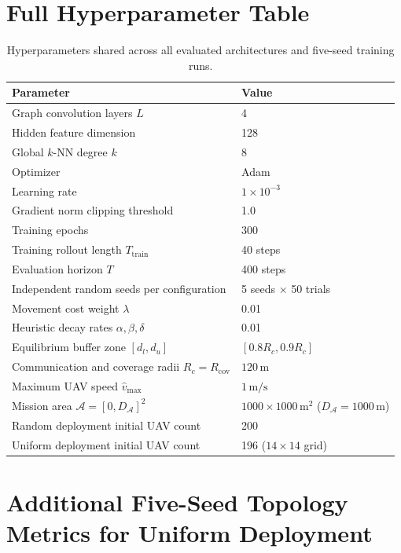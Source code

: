 \documentclass[11pt]{article}
\theoremstyle{plain}
\theoremstyle{definition}
\theoremstyle{remark}
\begin{document}
\section{Full Hyperparameter Table}
\label{app:hyperparams}

\begin{table}[ht]
\centering
\caption{Hyperparameters shared across all evaluated architectures and five-seed training runs.}
\small
\begin{tabular}{@{}ll@{}}
\toprule
Parameter & Value \\
\midrule
Graph convolution layers $L$ & 4 \\
Hidden feature dimension & 128 \\
Global $k$-NN degree $k$ & 8 \\
Optimizer & Adam \\
Learning rate & $1\times10^{-3}$ \\
Gradient norm clipping threshold & 1.0 \\
Training epochs & 300 \\
Training rollout length $T_{\mathrm{train}}$ & 40 steps \\
Evaluation horizon $T$ & 400 steps \\
Independent random seeds per configuration & 5 seeds $\times$ 50 trials \\
Movement cost weight $\lambda$ & 0.01 \\
Heuristic decay rates $\alpha, \beta, \delta$ & 0.01 \\
Equilibrium buffer zone $[d_l, d_u]$ & $[0.8 R_c, 0.9 R_c]$ \\
Communication and coverage radii $R_c = R_{\mathrm{cov}}$ & $120\,\mathrm{m}$ \\
Maximum UAV speed $\hat{v}_{\max}$ & $1\,\mathrm{m/s}$ \\
Mission area $\mathcal{A} = [0, D_{\mathcal{A}}]^2$ & $1000\times1000\,\mathrm{m}^2$ ($D_{\mathcal{A}} = 1000\,\mathrm{m}$) \\
Random deployment initial UAV count & 200 \\
Uniform deployment initial UAV count & 196 ($14\times14$ grid) \\
\bottomrule
\end{tabular}
\end{table}

\section{Additional Five-Seed Topology Metrics for Uniform Deployment}
\label{app:additional}
\end{document}

